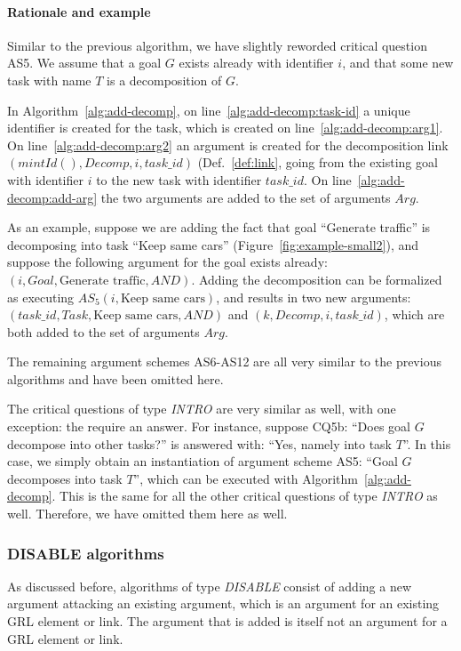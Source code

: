 \paragraph{Rationale and example} Similar to the previous algorithm, we have slightly reworded critical question AS5. We assume that a goal $G$ exists already with identifier $i$, and that some new task with name $T$ is a decomposition of $G$. 

In Algorithm~\ref{alg:add-decomp}, on line~\ref{alg:add-decomp:task-id} a unique identifier is created for the task, which is created on line~\ref{alg:add-decomp:arg1}. On line~\ref{alg:add-decomp:arg2} an argument is created for the decomposition link $(mintId(), Decomp, i, task\_id)$ (Def.~\ref{def:link}, going from the existing goal with identifier $i$ to the new task with identifier $task\_id$. On line~\ref{alg:add-decomp:add-arg} the two arguments are added to the set of arguments $Arg$.

As an example, suppose we are adding the fact that goal ``Generate traffic'' is decomposing into task ``Keep same cars'' (Figure~\ref{fig:example-small2}), and suppose the following argument for the goal exists already: $(i, Goal,\text{Generate traffic}, AND)$. Adding the decomposition can be formalized as executing $AS_5(i, \text{Keep same cars})$, and results in two new arguments: $(task\_id, Task, \text{Keep same cars}, AND)$ and $(k, Decomp, i, task\_id)$, which are both added to the set of arguments $Arg$.

The remaining argument schemes AS6-AS12 are all very similar to the previous algorithms and have been omitted here.

The critical questions of type \emph{INTRO} are very similar as well, with one exception: the require an answer. For instance, suppose CQ5b: ``Does goal $G$ decompose into other tasks?'' is answered with: ``Yes, namely into task $T$''. In this case, we simply obtain an instantiation of argument scheme AS5: ``Goal $G$ decomposes into task $T$'', which can be executed with Algorithm~\ref{alg:add-decomp}. This is the same for all the other critical questions of type \emph{INTRO} as well. Therefore, we have omitted them here as well.

\subsubsection{DISABLE algorithms}

As discussed before, algorithms of type \emph{DISABLE} consist of adding a new argument attacking an existing argument, which is an argument for an existing GRL element or link. The argument that is added is itself not an argument for a GRL element or link.

